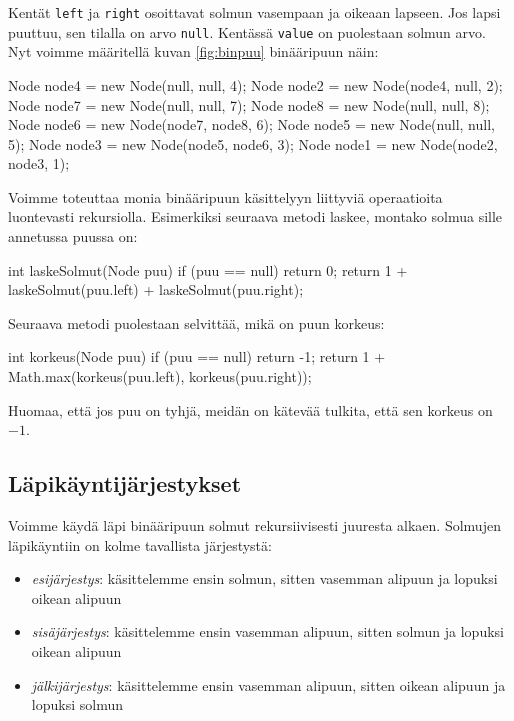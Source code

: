Kentät \texttt{left} ja \texttt{right} osoittavat solmun
vasempaan ja oikeaan lapseen.
Jos lapsi puuttuu, sen tilalla on arvo \texttt{null}.
Kentässä \texttt{value} on puolestaan solmun arvo.
Nyt voimme määritellä kuvan \ref{fig:binpuu} binääripuun näin:

\begin{code}
Node node4 = new Node(null, null, 4);
Node node2 = new Node(node4, null, 2);
Node node7 = new Node(null, null, 7);
Node node8 = new Node(null, null, 8);
Node node6 = new Node(node7, node8, 6);
Node node5 = new Node(null, null, 5);
Node node3 = new Node(node5, node6, 3);
Node node1 = new Node(node2, node3, 1);
\end{code}

Voimme toteuttaa monia binääripuun käsittelyyn liittyviä
operaatioita luontevasti rekursiolla.
Esimerkiksi seuraava metodi laskee, montako solmua
sille annetussa puussa on:

\begin{code}
int laskeSolmut(Node puu) {
    if (puu == null) return 0;
    return 1 + laskeSolmut(puu.left) + laskeSolmut(puu.right);
}
\end{code}

Seuraava metodi puolestaan selvittää, mikä on puun korkeus:

\begin{code}
int korkeus(Node puu) {
    if (puu == null) return -1;
    return 1 + Math.max(korkeus(puu.left), korkeus(puu.right));
}
\end{code}

Huomaa, että jos puu on tyhjä, meidän on kätevää tulkita,
että sen korkeus on $-1$.

\subsection{Läpikäyntijärjestykset}

Voimme käydä läpi binääripuun solmut rekursiivisesti
juuresta alkaen.
Solmujen läpikäyntiin on kolme tavallista järjestystä:

\begin{itemize}
\item \emph{esijärjestys}: käsittelemme ensin solmun, sitten vasemman alipuun
ja lopuksi oikean alipuun
\item \emph{sisäjärjestys}: käsittelemme ensin vasemman alipuun, sitten solmun
ja lopuksi oikean alipuun
\item \emph{jälkijärjestys}: käsittelemme ensin vasemman alipuun,
sitten oikean alipuun ja lopuksi solmun
\end{itemize}

